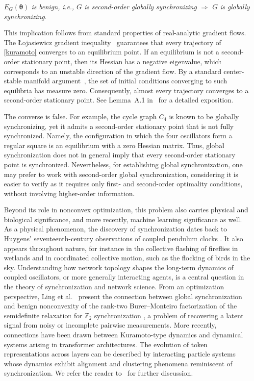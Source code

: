 \documentclass[11pt,reqno]{amsart}
\theoremstyle{definition}
\begin{document}
\begin{center}
    \textit{$E_G(\boldsymbol \theta)$ is benign, i.e., $G$ is second-order globally synchronizing
    $\Rightarrow$
    $G$ is globally synchronizing.}
\end{center}

This implication follows from standard properties of real-analytic gradient flows. 
The \L{}ojasiewicz gradient inequality~\cite{Lageman2007} guarantees that every trajectory of \eqref{kuramoto} converges to an equilibrium point. 
If an equilibrium is not a second-order stationary point, then its Hessian has a negative eigenvalue, which corresponds to an unstable direction of the gradient flow.
By a standard center-stable manifold argument~\cite{Shub1987}, the set of initial conditions converging to such equilibria has measure zero. 
Consequently, almost every trajectory converges to a second-order stationary point. 
See Lemma~A.1 in~\cite{Geshkovski2025} for a detailed exposition.

The converse is false. For example, the cycle graph $C_4$ is known to be globally synchronizing, yet it admits a second-order stationary point that is not fully synchronized. Namely, the configuration in which the four oscillators form a regular square is an equilibrium with a zero Hessian matrix. Thus, global synchronization does not in general imply that every second-order stationary point is synchronized. Nevertheless, for establishing global synchronization, one may prefer to work with second-order global synchronization, considering it is easier to verify as it requires only first- and second-order optimality conditions, without involving higher-order information.

Beyond its role in nonconvex optimization, this problem also carries physical and biological significance, and more recently, machine learning significance as well.
As a physical phenomenon, the discovery of synchronization dates back to Huygens' seventeenth-century observations of coupled pendulum clocks \cite{PikovskyRosenblumKurths2001}. It also appears throughout nature, for instance in the collective flashing of fireflies in wetlands and in coordinated collective motion, such as the flocking of birds in the sky. Understanding how network topology shapes the long-term dynamics of coupled oscillators, or more generally interacting agents, is a central question in the theory of synchronization and network science.
From an optimization perspective, Ling et al.~\cite{ling2019landscape} present the connection between global synchronization and benign nonconvexity of the rank-two Burer--Monteiro factorization of the semidefinite relaxation for $\mathbb{Z}_2$ synchronization \cite{bandeira2016low}, a problem of recovering a latent signal from noisy or incomplete pairwise measurements.
More recently, connections have been drawn between Kuramoto-type dynamics and dynamical systems arising in transformer architectures. The evolution of token representations across layers can be described by interacting particle systems whose dynamics exhibit alignment and clustering phenomena reminiscent of synchronization. We refer the reader to~\cite{geshkovski2023emergence,Geshkovski2025} for further discussion.
\end{document}
